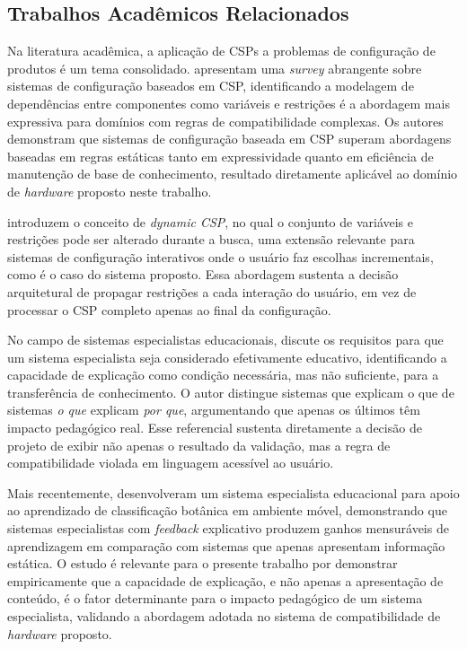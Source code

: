 \subsection{Trabalhos Acadêmicos Relacionados}
Na literatura acadêmica, a aplicação de CSPs a problemas de configuração de produtos é um tema consolidado.
\textcite{Sabin1998} apresentam uma \textit{survey} abrangente sobre sistemas de configuração baseados em CSP,
identificando a modelagem de dependências entre componentes como variáveis e restrições é a abordagem mais
expressiva para domínios com regras de compatibilidade complexas. Os autores demonstram que sistemas de configuração
baseada em CSP superam abordagens baseadas em regras estáticas tanto em expressividade quanto em eficiência de
manutenção de base de conhecimento, resultado diretamente aplicável ao domínio de \textit{hardware} proposto neste trabalho.

\textcite{Mittal1989} introduzem o conceito de \textit{dynamic CSP}, no qual o conjunto de variáveis e restrições
pode ser alterado durante a busca, uma extensão relevante para sistemas de configuração interativos onde o
usuário faz escolhas incrementais, como é o caso do sistema proposto. Essa abordagem sustenta a decisão arquitetural
de propagar restrições a cada interação do usuário, em vez de processar o CSP completo apenas ao final da configuração.

No campo de sistemas especialistas educacionais, \textcite{Nwana1990} discute os requisitos para que um sistema
especialista seja considerado efetivamente educativo, identificando a capacidade de explicação como condição necessária,
mas não suficiente, para a transferência de conhecimento. O autor distingue sistemas que explicam o que de sistemas
\textit{o que} explicam \textit{por que}, argumentando que apenas os últimos têm impacto pedagógico real. Esse
referencial sustenta diretamente a decisão de projeto de exibir não apenas o resultado da validação, mas a regra de
compatibilidade violada em linguagem acessível ao usuário.

Mais recentemente, \textcite{Wang2018} desenvolveram um sistema especialista educacional para apoio ao aprendizado
de classificação botânica em ambiente móvel, demonstrando que sistemas especialistas com \textit{feedback} explicativo
produzem ganhos mensuráveis de aprendizagem em comparação com sistemas que apenas apresentam informação estática.
O estudo é relevante para o presente trabalho por demonstrar empiricamente que a capacidade de explicação, e não
apenas a apresentação de conteúdo, é o fator determinante para o impacto pedagógico de um sistema especialista,
validando a abordagem adotada no sistema de compatibilidade de \textit{hardware} proposto.

